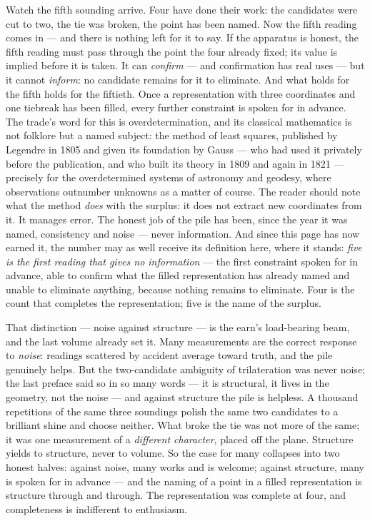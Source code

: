 Watch the fifth sounding arrive. Four have done their work: the candidates
were cut to two, the tie was broken, the point has been named. Now the
fifth reading comes in --- and there is nothing left for it to say. If the
apparatus is honest, the fifth reading must pass through the point the
four already fixed; its value is implied before it is taken. It can
\emph{confirm} --- and confirmation has real uses --- but it cannot
\emph{inform}: no candidate remains for it to eliminate. And what holds
for the fifth holds for the fiftieth. Once a representation with three
coordinates and one tiebreak has been filled, every further constraint is
spoken for in advance. The trade's word for this is overdetermination, and
its classical mathematics is not folklore but a named subject: the method
of least squares, published by Legendre in 1805 and given its foundation
by Gauss --- who had used it privately before the publication, and who
built its theory in 1809 and again in 1821 --- precisely for the
overdetermined systems of astronomy and geodesy, where observations
outnumber unknowns as a matter of course. The reader should note what the
method \emph{does} with the surplus: it does not extract new coordinates
from it. It manages error. The honest job of the pile has been, since the
year it was named, consistency and noise --- never information. And since
this page has now earned it, the number may as well receive its
definition here, where it stands: \emph{five is the first reading that
gives no information} --- the first constraint spoken for in advance,
able to confirm what the filled representation has already named and
unable to eliminate anything, because nothing remains to eliminate. Four
is the count that completes the representation; five is the name of the
surplus.

That distinction --- noise against structure --- is the earn's load-bearing
beam, and the last volume already set it. Many measurements are the
correct response to \emph{noise}: readings scattered by accident average
toward truth, and the pile genuinely helps. But the two-candidate
ambiguity of trilateration was never noise; the last preface said so in so
many words --- it is structural, it lives in the geometry, not the noise
--- and against structure the pile is helpless. A thousand repetitions of
the same three soundings polish the same two candidates to a brilliant
shine and choose neither. What broke the tie was not more of the same; it
was one measurement of a \emph{different character}, placed off the plane.
Structure yields to structure, never to volume. So the case for many
collapses into two honest halves: against noise, many works and is
welcome; against structure, many is spoken for in advance --- and the
naming of a point in a filled representation is structure through and
through. The representation was complete at four, and completeness is
indifferent to enthusiasm.

